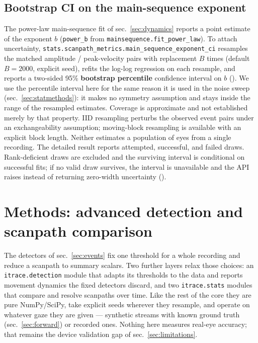 \documentclass[
]{article}
\begin{document}
\subsection{Bootstrap CI on the main-sequence
exponent}\label{bootstrap-ci-on-the-main-sequence-exponent}

The power-law main-sequence fit of sec.~\ref{sec:dynamics} reports a
point estimate of the exponent \(b\) (\texttt{power\_b} from
\texttt{mainsequence.fit\_power\_law}). To attach uncertainty,
\texttt{stats.scanpath\_metrics.main\_sequence\_exponent\_ci} resamples
the matched amplitude / peak-velocity pairs with replacement \(B\) times
(default \(B = 2000\), explicit seed), refits the log-log regression on
each resample, and reports a two-sided 95\% \textbf{bootstrap
percentile} confidence interval on \(b\)
(). We
use the percentile interval here for the same reason it is used in the
noise sweep (sec.~\ref{sec:statmethods}): it makes no symmetry
assumption and stays inside the range of the resampled estimates.
Coverage is approximate and not established merely by that property. IID
resampling perturbs the observed event pairs under an exchangeability
assumption; moving-block resampling is available with an explicit block
length. Neither estimates a population of eyes from a single recording.
The detailed result reports attempted, successful, and failed draws.
Rank-deficient draws are excluded and the surviving interval is
conditional on successful fits; if no valid draw survives, the interval
is unavailable and the API raises instead of returning zero-width
uncertainty ().

\section{Methods: advanced detection and scanpath
comparison}\label{sec:advdetect}

The detectors of sec.~\ref{sec:events} fix one threshold for a whole
recording and reduce a scanpath to summary scalars. Two further layers
relax those choices: an \texttt{itrace.detection} module that adapts its
thresholds to the data and reports movement dynamics the fixed detectors
discard, and two \texttt{itrace.stats} modules that compare and resolve
scanpaths over time. Like the rest of the core they are pure
NumPy/SciPy, take explicit seeds wherever they resample, and operate on
whatever gaze they are given --- synthetic streams with known ground
truth (sec.~\ref{sec:forward}) or recorded ones. Nothing here measures
real-eye accuracy; that remains the device validation gap of
sec.~\ref{sec:limitations}.
\end{document}
